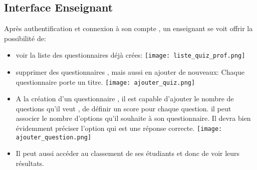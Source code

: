 \documentclass[12pt,a4paper]{article}
\begin{document}
\subsection{Interface Enseignant}
Après authentification et connexion à son compte , un enseignant se voit offrir la possibilité de:
\begin{center}
\begin{itemize}

\item voir la liste des questionnaires déjà crées:
\newline
\texttt{[image: liste\_quiz\_prof.png]}
\item supprimer des questionnaires , mais aussi en ajouter de nouveaux:
Chaque questionnaire porte un titre.
\newline
\texttt{[image: ajouter\_quiz.png]}
\item A la création d'un questionnaire , il est capable d'ajouter le nombre de questions qu'il veut , de définir un score pour chaque question. il peut associer le nombre d'options qu'il souhaite à son questionnaire. Il devra bien évidemment préciser l'option qui est une réponse correcte.
\newline
\texttt{[image: ajouter\_question.png]}
\item  Il peut aussi accéder au classement de ses étudiants et donc de voir leurs résultats.
\end{itemize}
\end{center}
\end{document}
